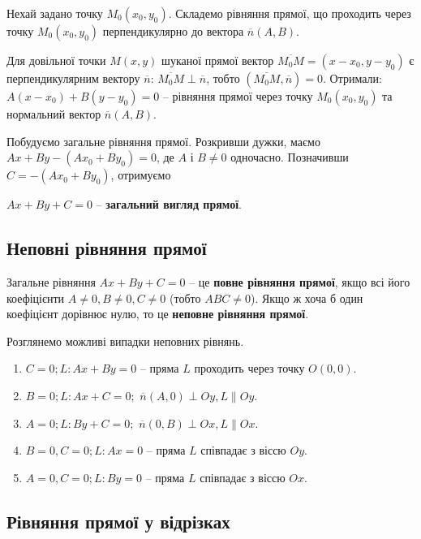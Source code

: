 Нехай задано точку $M_0(x_0, y_0)$. Складемо рівняння прямої, що проходить
через точку $M_0(x_0, y_0)$ перпендикулярно до вектора $\overline{n}(A, B)$.

Для довільної точки $M(x, y)$ шуканої прямої вектор $\overline{M_0 M} = (x-x_0, y-y_0)$ є
перпендикулярним вектору $\overline{n}$: $\overline{M_0 M} \perp \overline{n}$, тобто $(\overline{M_0 M}, \overline{n}) = 0$. Отримали:
$A(x-x_0) + B(y-y_0) = 0$ -- рівняння прямої через точку $M_0(x_0, y_0)$ та нормальний вектор $\overline{n}(A, B)$.

Побудуємо загальне рівняння прямої. Розкривши дужки, маємо $Ax + By - (Ax_0 + By_0) = 0$, де $A$ і $B \neq 0$
одночасно. Позначивши $C = -(Ax_0 + By_0)$, отримуємо 

\begin{center}
	$Ax + By + C = 0$ -- \textbf{загальний вигляд прямої}.
\end{center}

\subsection{Неповні рівняння прямої}

\begin{definition}
	Загальне рівняння $Ax + By + C = 0$ -- це \textbf{повне рівняння прямої}, якщо всі його
	коефіцієнти $A \neq 0, B \neq 0, C \neq 0$ (тобто $ABC \neq 0$). Якщо ж хоча б один коефіцієнт
	дорівнює нулю, то це \textbf{неповне рівняння прямої}.
\end{definition}

Розглянемо можливі випадки неповних рівнянь.
\begin{enumerate}
\item $C = 0; L: Ax + By = 0$ -- пряма $L$ проходить через точку $O(0,0)$.
\item $B = 0; L: Ax + C = 0;$ $\overline{n}(A, 0) \perp Oy, L \parallel Oy$.
\item $A = 0; L: By + C = 0;$ $\overline{n}(0, B) \perp Ox, L \parallel Ox$.
\item $B = 0, C = 0; L: Ax = 0$ -- пряма $L$ співпадає з віссю $Oy$.
\item $A = 0, C = 0; L: By = 0$ -- пряма $L$ співпадає з віссю $Ox$.
\end{enumerate}

\subsection{Рівняння прямої у відрізках}

